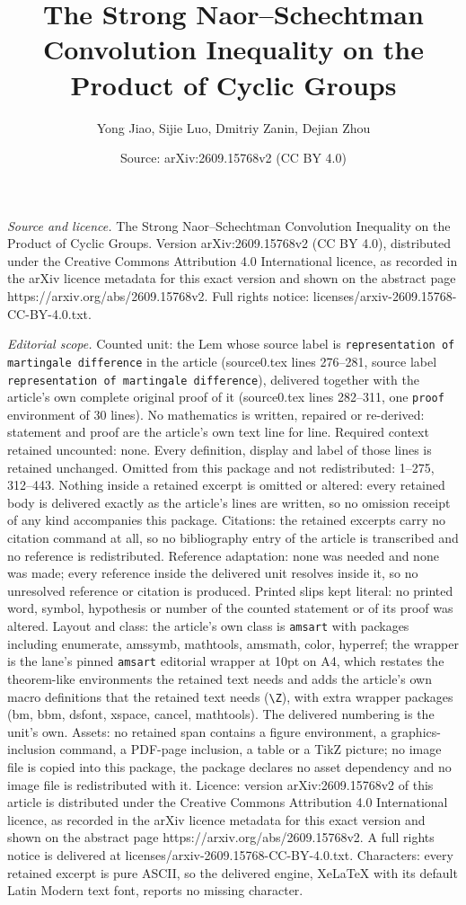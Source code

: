 \documentclass[10pt,a4paper]{amsart}
\title[The Strong Naor--Schechtman Convolution Inequality on the Pr]{The Strong Naor--Schechtman Convolution Inequality on the Product of Cyclic Groups}
\author{Yong Jiao, Sijie Luo, Dmitriy Zanin, Dejian Zhou}
\date{Source: arXiv:2609.15768v2 (CC BY 4.0)}
\begin{document}
\maketitle

\noindent\emph{Source and licence.} The Strong Naor--Schechtman Convolution Inequality on the Product of Cyclic Groups. Version arXiv:2609.15768v2 (CC BY 4.0), distributed under the Creative Commons Attribution 4.0 International licence, as recorded in the arXiv licence metadata for this exact version and shown on the abstract page https://arxiv.org/abs/2609.15768v2. Full rights notice: licenses/arxiv-2609.15768-CC-BY-4.0.txt.\par\smallskip

\noindent\textit{Editorial scope.} Counted unit: the Lem whose source label is \texttt{representation of martingale difference} in the article (source0.tex lines 276--281, source label \texttt{representation of martingale difference}), delivered together with the article's own complete original proof of it (source0.tex lines 282--311, one \texttt{proof} environment of 30 lines). No mathematics is written, repaired or re-derived: statement and proof are the article's own text line for line. Required context retained uncounted: none. Every definition, display and label of those lines is retained unchanged. Omitted from this package and not redistributed: 1--275, 312--443. Nothing inside a retained excerpt is omitted or altered: every retained body is delivered exactly as the article's lines are written, so no omission receipt of any kind accompanies this package. Citations: the retained excerpts carry no citation command at all, so no bibliography entry of the article is transcribed and no reference is redistributed. Reference adaptation: none was needed and none was made; every reference inside the delivered unit resolves inside it, so no unresolved reference or citation is produced. Printed slips kept literal: no printed word, symbol, hypothesis or number of the counted statement or of its proof was altered. Layout and class: the article's own class is \texttt{amsart} with packages including enumerate, amssymb, mathtools, amsmath, color, hyperref; the wrapper is the lane's pinned \texttt{amsart} editorial wrapper at 10pt on A4, which restates the theorem-like environments the retained text needs and adds the article's own macro definitions that the retained text needs (\texttt{\textbackslash Z}), with extra wrapper packages (bm, bbm, dsfont, xspace, cancel, mathtools). The delivered numbering is the unit's own. Assets: no retained span contains a figure environment, a graphics-inclusion command, a PDF-page inclusion, a table or a TikZ picture; no image file is copied into this package, the package declares no asset dependency and no image file is redistributed with it. Licence: version arXiv:2609.15768v2 of this article is distributed under the Creative Commons Attribution 4.0 International licence, as recorded in the arXiv licence metadata for this exact version and shown on the abstract page https://arxiv.org/abs/2609.15768v2. A full rights notice is delivered at licenses/arxiv-2609.15768-CC-BY-4.0.txt. Characters: every retained excerpt is pure ASCII, so the delivered engine, XeLaTeX with its default Latin Modern text font, reports no missing character.
\end{document}
